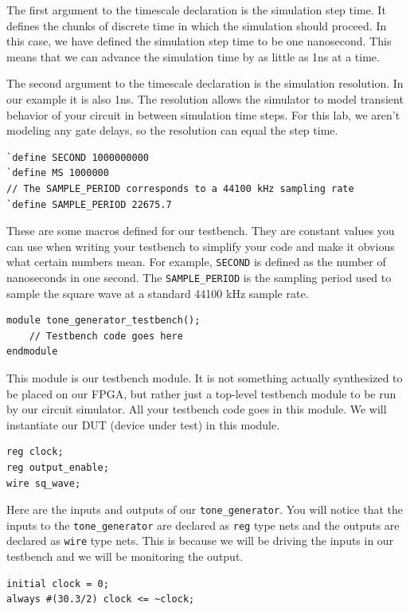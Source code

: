 \documentclass[11pt]{article}
\begin{document}
The first argument to the timescale declaration is the simulation step time. It defines the chunks of discrete time in which the simulation should proceed. In this case, we have defined the simulation step time to be one nanosecond. This means that we can advance the simulation time by as little as 1ns at a time.

The second argument to the timescale declaration is the simulation resolution. In our example it is also 1ns. The resolution allows the simulator to model transient behavior of your circuit in between simulation time steps. For this lab, we aren't modeling any gate delays, so the resolution can equal the step time.

\begin{verbatim}
`define SECOND 1000000000
`define MS 1000000
// The SAMPLE_PERIOD corresponds to a 44100 kHz sampling rate
`define SAMPLE_PERIOD 22675.7
\end{verbatim}

These are some macros defined for our testbench. They are constant values you can use when writing your testbench to simplify your code and make it obvious what certain numbers mean. For example, \verb|SECOND| is defined as the number of nanoseconds in one second. The \verb|SAMPLE_PERIOD| is the sampling period used to sample the square wave at a standard 44100 kHz sample rate.

\begin{verbatim}
module tone_generator_testbench();
	// Testbench code goes here
endmodule
\end{verbatim}

This module is our testbench module. It is not something actually synthesized to be placed on our FPGA, but rather just a top-level testbench module to be run by our circuit simulator. All your testbench code goes in this module. We will instantiate our DUT (device under test) in this module.

\begin{verbatim}
reg clock;
reg output_enable;
wire sq_wave;
\end{verbatim}

Here are the inputs and outputs of our \verb|tone_generator|. You will notice that the inputs to the \verb|tone_generator| are declared as \verb|reg| type nets and the outputs are declared as \verb|wire| type nets. This is because we will be driving the inputs in our testbench and we will be monitoring the output.

\begin{verbatim}
initial clock = 0;
always #(30.3/2) clock <= ~clock;
\end{verbatim}
\end{document}
